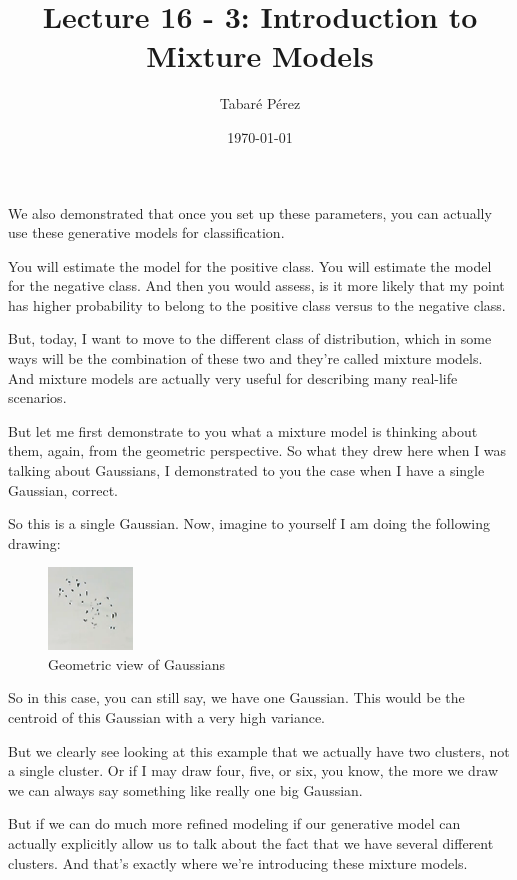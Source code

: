 \documentclass[a4paper, 12pt]{article}
\author{Tabaré Pérez}
\date{\today}
\title{Lecture 16 - 3: Introduction to Mixture Models}
\begin{document}
\maketitle
We also demonstrated that once you set up these parameters, you can actually use
these generative models for classification.

You will estimate the model for the positive class. You will estimate the model
for the negative class. And then you would assess, is it more likely that my
point has higher probability to belong to the positive class versus to the
negative class.

But, today, I want to move to the different class of distribution, which in some
ways will be the combination of these two and they're called mixture models. And
mixture models are actually very useful for describing many real-life scenarios.

But let me first demonstrate to you what a mixture model is thinking about them,
again, from the geometric perspective. So what they drew here when I was talking
about Gaussians, I demonstrated to you the case when I have a single Gaussian,
correct.

So this is a single Gaussian. Now, imagine to yourself I am doing the following
drawing:

\begin{figure}[H]
\centering
\includegraphics[width=0.2\textwidth]{./pic/u04-03-fig-01.png}
\caption{\label{fig:orgd55ec56}Geometric view of Gaussians}
\end{figure}

So in this case, you can still say, we have one Gaussian. This would be the
centroid of this Gaussian with a very high variance.

But we clearly see looking at this example that we actually have two clusters,
not a single cluster. Or if I may draw four, five, or six, you know, the more we
draw we can always say something like really one big Gaussian.

But if we can do much more refined modeling if our generative model can actually
explicitly allow us to talk about the fact that we have several different
clusters. And that's exactly where we're introducing these mixture models.
\end{document}
